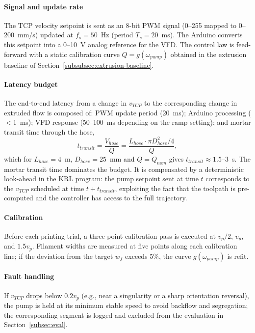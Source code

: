 \documentclass[conference]{IEEEtran}
\begin{document}
\paragraph{Signal and update rate} The TCP velocity setpoint is sent as an 8-bit PWM signal (0--255 mapped to 0--200~mm/s) updated at $f_s = 50$~Hz (period $T_s = 20$~ms). The Arduino converts this setpoint into a 0--10~V analog reference for the VFD. The control law is feed-forward with a static calibration curve $Q = g(\omega_{pump})$ obtained in the extrusion baseline of Section~\ref{subsubsec:extrusion-baseline}.

\paragraph{Latency budget} The end-to-end latency from a change in $v_{TCP}$ to the corresponding change in extruded flow is composed of: PWM update period (20~ms); Arduino processing ($<$1~ms); VFD response (50--100~ms depending on the ramp setting); and mortar transit time through the hose,
\begin{equation}
    t_{transit} = \frac{V_{hose}}{Q} = \frac{L_{hose} \cdot \pi D_{hose}^2 / 4}{Q},
    \label{eq:transit}
\end{equation}
which for $L_{hose} = 4$~m, $D_{hose} = 25$~mm and $Q = Q_{nom}$ gives $t_{transit} \approx 1.5$--3~s. The mortar transit time dominates the budget. It is compensated by a deterministic look-ahead in the KRL program: the pump setpoint sent at time $t$ corresponds to the $v_{TCP}$ scheduled at time $t + t_{transit}$, exploiting the fact that the toolpath is pre-computed and the controller has access to the full trajectory.

\paragraph{Calibration} Before each printing trial, a three-point calibration pass is executed at $v_p/2$, $v_p$, and $1.5 v_p$. Filament widths are measured at five points along each calibration line; if the deviation from the target $w_f$ exceeds 5\%, the curve $g(\omega_{pump})$ is refit.

\paragraph{Fault handling} If $v_{TCP}$ drops below $0.2 v_p$ (e.g., near a singularity or a sharp orientation reversal), the pump is held at its minimum stable speed to avoid backflow and segregation; the corresponding segment is logged and excluded from the evaluation in Section~\ref{subsec:eval}.
\end{document}
